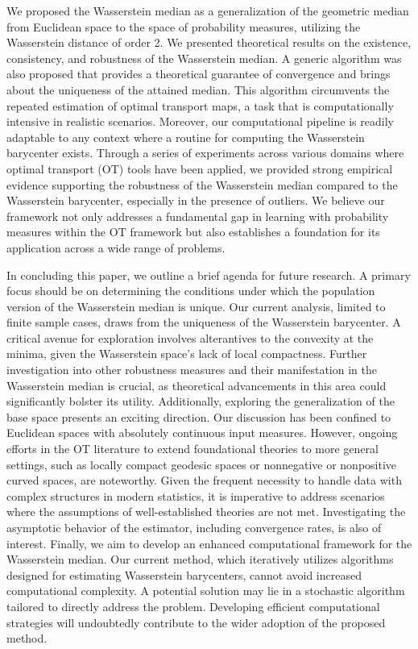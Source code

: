 \documentclass[11pt]{article}
\begin{document}
We proposed the Wasserstein median as a generalization of the geometric median from Euclidean space to the space of probability measures, utilizing the Wasserstein distance of order 2. We presented theoretical results on the existence, consistency, and robustness of the Wasserstein median. A generic algorithm was also proposed that provides a theoretical guarantee of convergence and brings about the uniqueness of the attained median. This algorithm circumvents the repeated estimation of optimal transport maps, a task that is computationally intensive in realistic scenarios. Moreover, our computational pipeline is readily adaptable to any context where a routine for computing the Wasserstein barycenter exists. Through a series of experiments across various domains where optimal transport (OT) tools have been applied, we provided strong empirical evidence supporting the robustness of the Wasserstein median compared to the Wasserstein barycenter, especially in the presence of outliers. We believe our framework not only addresses a fundamental gap in learning with probability measures within the OT framework but also establishes a foundation for its application across a wide range of problems.

In concluding this paper, we outline a brief agenda for future research. A primary focus should be on determining the conditions under which the population version of the Wasserstein median is unique. Our current analysis, limited to finite sample cases, draws from the uniqueness of the Wasserstein barycenter. A critical avenue for exploration involves alterantives to the convexity at the minima, given the Wasserstein space's lack of local compactness. Further investigation into other robustness measures and their manifestation in the Wasserstein median is crucial, as theoretical advancements in this area could significantly bolster its utility. Additionally, exploring the generalization of the base space presents an exciting direction. Our discussion has been confined to Euclidean spaces with absolutely continuous input measures. However, ongoing efforts in the OT literature to extend foundational theories to more general settings, such as locally compact geodesic spaces or nonnegative or nonpositive curved spaces, are noteworthy. Given the frequent necessity to handle data with complex structures in modern statistics, it is imperative to address scenarios where the assumptions of well-established theories are not met. Investigating the asymptotic behavior of the estimator, including convergence rates, is also of interest. Finally, we aim to develop an enhanced computational framework for the Wasserstein median. Our current method, which iteratively utilizes algorithms designed for estimating Wasserstein barycenters, cannot avoid increased computational complexity. A potential solution may lie in a stochastic algorithm tailored to directly address the problem. Developing efficient computational strategies will undoubtedly contribute to the wider adoption of the proposed method.
\end{document}
